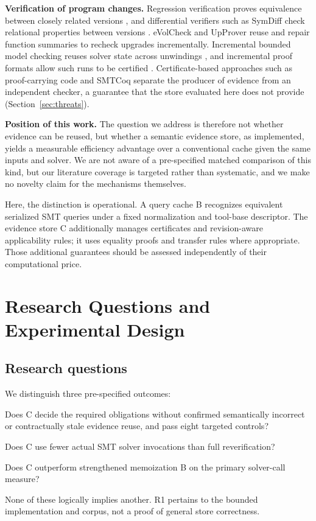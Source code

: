\documentclass[10pt,twocolumn]{article}
\begin{document}
\textbf{Verification of program changes.} Regression verification proves equivalence between closely related versions \cite{godlin2009}, and differential verifiers such as SymDiff check relational properties between versions \cite{symdiff}. eVolCheck \cite{fedyukovich2013} and UpProver \cite{asadi2023} reuse and repair function summaries to recheck upgrades incrementally. Incremental bounded model checking reuses solver state across unwindings \cite{schrammel2014}, and incremental proof formats allow such runs to be certified \cite{fazekas2024}. Certificate-based approaches such as proof-carrying code \cite{necula1997} and SMTCoq \cite{ekici2017} separate the producer of evidence from an independent checker, a guarantee that the store evaluated here does not provide (Section~\ref{sec:threats}).

\textbf{Position of this work.} The question we address is therefore not whether evidence can be reused, but whether a semantic evidence store, as implemented, yields a measurable efficiency advantage over a conventional cache given the same inputs and solver. We are not aware of a pre-specified matched comparison of this kind, but our literature coverage is targeted rather than systematic, and we make no novelty claim for the mechanisms themselves.

Here, the distinction is operational. A query cache B recognizes equivalent serialized SMT queries under a fixed normalization and tool-base descriptor. The evidence store C additionally manages certificates and revision-aware applicability rules; it uses equality proofs and transfer rules where appropriate. Those additional guarantees should be assessed independently of their computational price.

\section{Research Questions and Experimental Design}
\subsection{Research questions}
We distinguish three pre-specified outcomes:
\begin{description}[leftmargin=0pt,style=nextline]
\item[R1: safety.] Does C decide the required obligations without confirmed semantically incorrect or contractually stale evidence reuse, and pass eight targeted controls?
\item[R2: savings over A.] Does C use fewer actual SMT solver invocations than full reverification?
\item[R3: differential efficiency.] Does C outperform strengthened memoization B on the primary solver-call measure?
\end{description}
None of these logically implies another. R1 pertains to the bounded implementation and corpus, not a proof of general store correctness.
\end{document}
